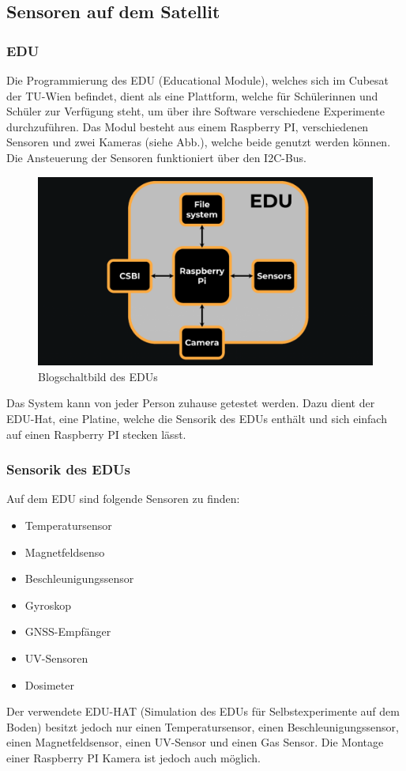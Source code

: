 \newpage
\subsection{Sensoren auf dem Satellit}\label{sec:sensoraufcube}

\subsubsection{EDU}\label{edu}
Die Programmierung des EDU (Educational Module), welches sich im Cubesat der TU-Wien befindet, dient als eine Plattform, welche für Schülerinnen und Schüler zur Verfügung steht, um über ihre Software verschiedene Experimente durchzuführen. Das Modul besteht aus einem Raspberry PI, verschiedenen Sensoren und zwei Kameras (siehe Abb.), welche beide genutzt werden können. Die Ansteuerung der Sensoren funktioniert über den I2C-Bus. \\
\vspace{4mm}
\begin{figure}[H]
    \centering
    \includegraphics[scale = 0.8]{image/blockschaltnildedu.png}
    \caption{Blogschaltbild des EDUs}
    \label{fig:enter-label}
\end{figure}
\vspace{1mm}
Das System kann von jeder Person zuhause getestet werden. Dazu dient der EDU-Hat, eine Platine, welche die Sensorik des EDUs enthält und sich einfach auf einen Raspberry PI stecken lässt.
\newpage
\subsubsection{Sensorik des EDUs}
Auf dem EDU sind folgende Sensoren zu finden: 
\begin{itemize}
    \item Temperatursensor 
    \item Magnetfeldsenso
    \item Beschleunigungssensor
    \item Gyroskop
    \item GNSS-Empfänger
    \item UV-Sensoren
    \item Dosimeter
\end{itemize}
Der verwendete EDU-HAT (Simulation des EDUs für Selbstexperimente auf dem Boden) besitzt jedoch nur einen Temperatursensor, einen Beschleunigungssensor, einen Magnetfeldsensor, einen UV-Sensor und einen Gas Sensor. Die Montage einer Raspberry PI Kamera ist jedoch auch möglich.\\

